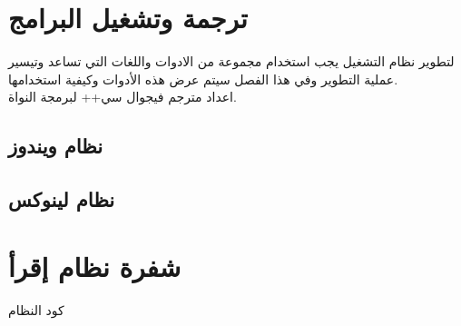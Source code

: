 \documentclass[document.tex]{subfiles}
\begin{document}
\appendix
\chapter{ترجمة وتشغيل البرامج}
\label{apx:compile_link}

لتطوير نظام التشغيل يجب استخدام مجموعة من الادوات واللغات التي تساعد وتيسير عملية التطوير وفي هذا الفصل سيتم عرض هذه الأدوات وكيفية استخدامها.\\

اعداد مترجم فيجوال سي++ لبرمجة النواة.
\section{نظام ويندوز}
\section{نظام لينوكس}



\chapter{شفرة نظام إقرأ}
كود النظام

%
\end{document}
